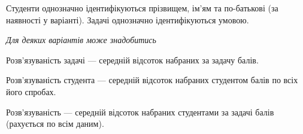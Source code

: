 \documentclass[11pt, ukrainian]{article}
\begin{document}
Студенти однозначно ідентифікуються прізвищем, ім’ям та по-батькові (за наявності у варіанті).
Задачі однозначно ідентифікуються умовою.

\bigskip\textit{Для деяких варіантів може знадобитись}

Розв'язуваність задачі --- середній відсоток набраних за задачу балів.

Розв'язуваність студента --- середній відсоток набраних студентом балів по всіх його спробах.

Розв'язуваність --- середній відсоток набраних студентами за задачі балів (рахується по всім даним).




\par
\newpage
\end{document}
